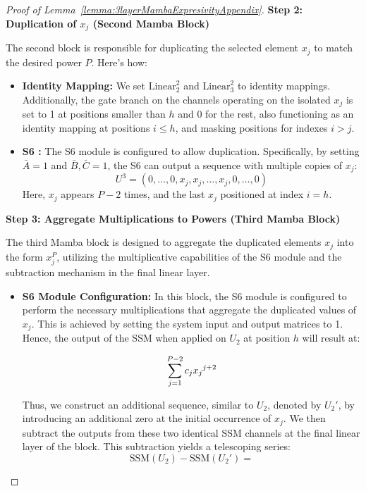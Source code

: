 \begin{proof}[Proof of Lemma~\ref{lemma:3layerMambaExpresivityAppendix}]
\noindent \textbf{Step 2: Duplication of \( x_j \) (Second Mamba Block)}

The second block is responsible for duplicating the selected element \( x_j \) to match the desired power \( P \). Here's how:

\begin{itemize}
    \item \textbf{Identity Mapping:} We set \( \text{Linear}_2^2 \) and \( \text{Linear}_3^2 \) to identity mappings. Additionally, the gate branch on the channels operating on the isolated \( x_j \) is set to 1 at positions smaller than $h$ and 0 for the rest, also functioning as an identity mapping at positions $i \leq h$, and masking positions for indexes $i>j$.

    \item \textbf{S6 :} The S6 module is configured to allow duplication. Specifically, by setting \( \bar{A} = 1 \) and \( \bar{B}, \bar{C} = 1 \), the S6 can output a sequence with multiple copies of \( x_j \):
    \[
    U^3 = (0, \dots, 0, x_j, x_j, \dots, x_j, 0, \dots, 0)
    \]
    Here, \( x_j \) appears \( P-2 \) times, and the last $x_j$ positioned at index $i=h$.
\end{itemize}



\noindent \textbf{Step 3: Aggregate Multiplications to Powers (Third Mamba Block)}

The third Mamba block is designed to aggregate the duplicated elements \( x_j \) into the form \( x_j^P \), utilizing the multiplicative capabilities of the S6 module and the subtraction mechanism in the final linear layer.

\begin{itemize}
    \item \textbf{S6 Module Configuration:} In this block, the S6 module is configured to perform the necessary multiplications that aggregate the duplicated values of \( x_j \). This is achieved by setting the system input and output matrices to 1. Hence, the output of the SSM when applied on $U_2$ at position $h$ will result at:
    
    \begin{equation}
    \small
    \sum_{j=1}^{P-2} c_j {x_j}^{j+2}
    \nonumber
    \end{equation}


Thus, we construct an additional sequence, similar to $U_2$, denoted by $U_2'$, by introducing an additional zero at the initial occurrence of $x_j$. We then subtract the outputs from these two identical SSM channels at the final linear layer of the block. This subtraction yields a telescoping series:
    \begin{equation}
    \text{SSM}(U_2) - \text{SSM}(U_2') = 
    \end{equation}
     

\end{itemize}
\end{proof}
